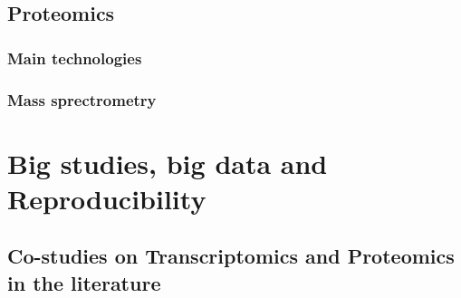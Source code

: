 \subsection{Proteomics}
    \subsubsection{Main technologies}
    \subsubsection{Mass sprectrometry}

\section{Big studies, big data and Reproducibility}



\begin{comment}
\subsection{Reproducibility issues}
        \begin{itemize}
            \item{Different samples}
            \item{Technology: wet lab but also software: Rupgrade, ....}
            \item{missing meta-data}
        \end{itemize}
    \subsection{Main concerns}
        \subsubsection{Detection}
        \subsubsection{Quantification}
    \subsection{Consistency through biological layers}
\end{comment}


\subsection{Co-studies on Transcriptomics and Proteomics in the literature}
